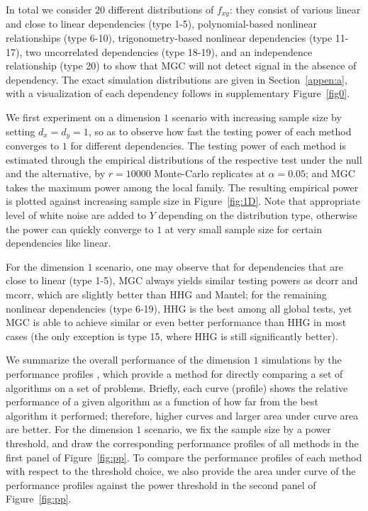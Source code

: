 \documentclass[11pt]{article}
\begin{document}
In total we consider $20$ different distributions of $f_{xy}$: they consist of various linear and close to linear dependencies (type 1-5), polynomial-based nonlinear relationships (type 6-10), trigonometry-based nonlinear dependencies (type 11-17), two uncorrelated dependencies (type 18-19), and an independence relationship (type 20) to show that MGC will not detect signal in the absence of dependency. The exact simulation distributions are given in Section~\ref{appen:a}, with a visualization of each dependency follows in supplementary Figure~\ref{fig0}.

We first experiment on a dimension $1$ scenario with increasing sample size by setting $d_{x}=d_{y}=1$, so as to observe how fast the testing power of each method converges to $1$ for different dependencies. The testing power of each method is estimated through the empirical distributions of the respective test under the null and the alternative, by $r=10000$ Monte-Carlo replicates at $\alpha=0.05$; and MGC takes the maximum power among the local family. The resulting empirical power is plotted against increasing sample size in Figure~\ref{fig:1D}. Note that appropriate level of white noise are added to $Y$ depending on the distribution type, otherwise the power can quickly converge to $1$ at very small sample size for certain dependencies like linear.

For the dimension $1$ scenario, one may observe that for dependencies that are close to linear (type 1-5), MGC always yields similar testing powers as dcorr and mcorr, which are slightly better than HHG and Mantel; for the remaining nonlinear dependencies (type 6-19), HHG is the best among all global tests, yet MGC is able to achieve similar or even better performance than HHG in most cases (the only exception is type 15, where HHG is still significantly better). 

We summarize the overall performance of the dimension $1$ simulations by the performance profiles \cite{DolanMore2002}, which provide a method for directly comparing a set of algorithms on a set of problems.  Briefly, each curve (profile) shows the relative performance of a given algorithm as a function of how far from the best algorithm it performed; therefore, higher curves and larger area under curve area are better. For the dimension $1$ scenario, we fix the sample size by a power threshold, and draw the corresponding performance profiles of all methods in the first panel of Figure~\ref{fig:pp}. To compare the performance profiles of each method with respect to the threshold choice, we also provide the area under curve of the performance profiles against the power threshold in the second panel of Figure~\ref{fig:pp}.
\end{document}
